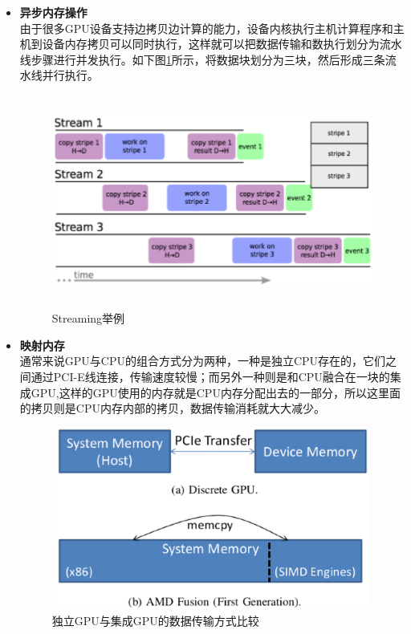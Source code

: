 \begin{itemize}
\item{\textbf{异步内存操作}} \\
由于很多GPU设备支持边拷贝边计算的能力，设备内核执行主机计算程序和主机到设备内存拷贝可以同时执行，这样就可以把数据传输和数执行划分为流水线步骤进行并发执行。如下图\ref{fig:Streaming}所示，将数据块划分为三块，然后形成三条流水线并行执行。
\\

\begin{figure}[H] 
  \centering
  \includegraphics[width=12cm,height=7cm]{figures/chap02/Streaming}
  \caption{Streaming举例}
  \label{fig:Streaming}
\end{figure}
\item{\textbf{映射内存}} \\
通常来说GPU与CPU的组合方式分为两种，一种是独立CPU存在的，它们之间通过PCI-E线连接，传输速度较慢；而另外一种则是和CPU融合在一块的集成GPU,这样的GPU使用的内存就是CPU内存分配出去的一部分，所以这里面的拷贝则是CPU内存内部的拷贝，数据传输消耗就大大减少。

\begin{figure}[H] 
  \centering
  \includegraphics[width=12cm,height=6cm]{figures/chap02/Transfer}
  \caption{独立GPU与集成GPU的数据传输方式比较}
  \label{fig:Transfer}
\end{figure}


\end{itemize}
